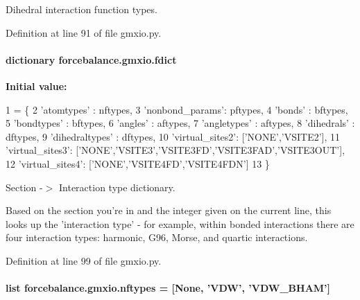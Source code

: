 Dihedral interaction function types. 



Definition at line 91 of file gmxio.\-py.

\hypertarget{namespaceforcebalance_1_1gmxio_a179cbde2e55b4c025af89b225612d6e1}{
\paragraph[{fdict}]{\setlength{\rightskip}{0pt plus 5cm}dictionary forcebalance.\-gmxio.\-fdict}}\label{namespaceforcebalance_1_1gmxio_a179cbde2e55b4c025af89b225612d6e1}
{\bfseries Initial value\-:}
\begin{DoxyCode}
1 = \{
2     \textcolor{stringliteral}{'atomtypes'}     : nftypes,
3     \textcolor{stringliteral}{'nonbond\_params'}: pftypes,
4     \textcolor{stringliteral}{'bonds'}         : bftypes,
5     \textcolor{stringliteral}{'bondtypes'}     : bftypes,
6     \textcolor{stringliteral}{'angles'}        : aftypes,
7     \textcolor{stringliteral}{'angletypes'}    : aftypes,
8     \textcolor{stringliteral}{'dihedrals'}     : dftypes,
9     \textcolor{stringliteral}{'dihedraltypes'} : dftypes,
10     \textcolor{stringliteral}{'virtual\_sites2'}: [\textcolor{stringliteral}{'NONE'},\textcolor{stringliteral}{'VSITE2'}],
11     \textcolor{stringliteral}{'virtual\_sites3'}: [\textcolor{stringliteral}{'NONE'},\textcolor{stringliteral}{'VSITE3'},\textcolor{stringliteral}{'VSITE3FD'},\textcolor{stringliteral}{'VSITE3FAD'},\textcolor{stringliteral}{'VSITE3OUT'}],
12     \textcolor{stringliteral}{'virtual\_sites4'}: [\textcolor{stringliteral}{'NONE'},\textcolor{stringliteral}{'VSITE4FD'},\textcolor{stringliteral}{'VSITE4FDN'}]
13     \}
\end{DoxyCode}


Section -\/$>$ Interaction type dictionary. 

Based on the section you're in and the integer given on the current line, this looks up the 'interaction type' -\/ for example, within bonded interactions there are four interaction types\-: harmonic, G96, Morse, and quartic interactions. 

Definition at line 99 of file gmxio.\-py.

\hypertarget{namespaceforcebalance_1_1gmxio_a337bc61280b58a43319380dec9c5529a}{
\paragraph[{nftypes}]{\setlength{\rightskip}{0pt plus 5cm}list forcebalance.\-gmxio.\-nftypes = \mbox{[}None, 'V\-D\-W', 'V\-D\-W\-\_\-\-B\-H\-A\-M'\mbox{]}}}\label{namespaceforcebalance_1_1gmxio_a337bc61280b58a43319380dec9c5529a}


